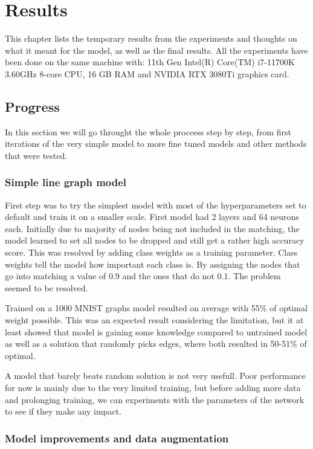 \chapter{Results}

This chapter lists the temporary results from the experiments and thoughts on what it meant for the model, as well as the final results. All the experiments have been done on the same machine with: 11th Gen Intel(R) Core(TM) i7-11700K 3.60GHz 8-core CPU, 16 GB RAM and NVIDIA RTX 3080Ti graphics card.

\section{Progress}

In this section we will go throught the whole proccess step by step, from first iterations of the very simple model to more fine tuned models and other methods that were tested.

\subsection{Simple line graph model}

First step was to try the simplest model with most of the hyperparameters set to default and train it on a smaller scale. First model had 2 layers and 64 neurons each. Initially due to majority of nodes being not included in the matching, the model learned to set all nodes to be dropped and still get a rather high accuracy score. This was resolved by adding class weights as a training parameter. Class weights tell the model how important each class is. By assigning the nodes that go into matching a value of 0.9 and the ones that do not 0.1. The problem seemed to be resolved.
 
Trained on a 1000 MNIST graphs model resulted on average with 55\% of optimal weight possible. This was an expected result considering the limitation, but it at least showed that model is gaining some knowledge compared to untrained model as well as a solution that randomly picks edges, where both resulted in 50-51\% of optimal. 

A model that barely beats random solution is not very usefull. Poor performance for now is mainly due to the very limited training, but before adding more data and prolonging training, we can experiments with the parameters of the network to see if they make any impact.

\subsection{Model improvements and data augmentation}

